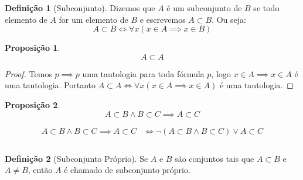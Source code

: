 \documentclass{article}
\theoremstyle{plain}
\newtheorem{prop}{Proposição}[section]
\theoremstyle{definition}
\newtheorem{definicao}{Definição}[section]
\theoremstyle{remark}
\begin{document}
\begin{definicao}[Subconjunto]
	Dizemos que $A$ é um subconjunto de $B$ se  todo elemento de $A$ for um elemento de $B$ e escrevemos $A\subset B$. Ou seja:
	$$ A \subset B \iff \forall x ( x\in A \implies x \in B)$$ 
\end{definicao}
\begin{prop}
	$$A\subset A$$
\end{prop}
\begin{proof}
	Temos $p \implies p$ uma tautologia para toda fórmula $p$, logo $x\in A \implies x \in A$ é uma tautologia. Portanto $A \subset A \iff \forall x ( x \in A \implies x\in A) $ é uma tautologia.
\end{proof}
\begin{prop}
	$$A\subset B \land B \subset C \implies A \subset C$$
\end{prop}
	\begin{align*}
		A\subset B \land B\subset C \implies A \subset C &\iff \neg ( A\subset B \land B\subset C) \lor  A \subset C\\~\\
	\end{align*}
\begin{definicao}[Subconjunto Próprio]
	Se $A$ e $B$ são conjuntos tais que $A\subset B$ e $A \neq B$, então $A$ é chamado de subconjunto próprio.
\end{definicao}
\end{document}
